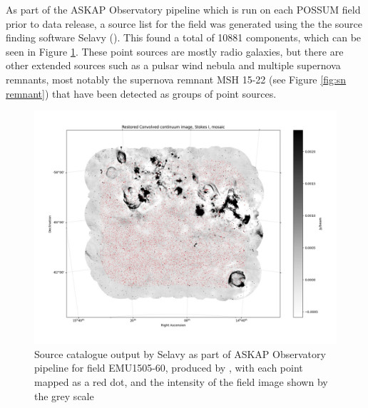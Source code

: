 As part of the ASKAP Observatory pipeline which is run on each POSSUM field prior to data release, a source list for the field was generated using the the source finding software Selavy (\cite{Selavy_Whiting_2012}). This found a total of 10881 components, which can be seen in Figure \ref{fig: validation_selavy}. These point sources are mostly radio galaxies, but there are other extended sources such as a pulsar wind nebula and multiple supernova remnants, most notably the supernova remnant MSH 15-22 (see Figure \ref{fig:sn remnant}) that have been detected as groups of point sources. 


\begin{figure}

\includegraphics[width=0.8\linewidth]{Thesis_Template/Figures/validation_sourcefinder.png}
\caption[Source catalogue produced by ASKAP Observatory pipeline]{Source catalogue output by Selavy as part of ASKAP Observatory pipeline for field EMU1505-60, produced by \cite{validation}, with each point mapped as a red dot, and the intensity of the field image shown by the grey scale}
\label{fig: validation_selavy}
\end{figure}

